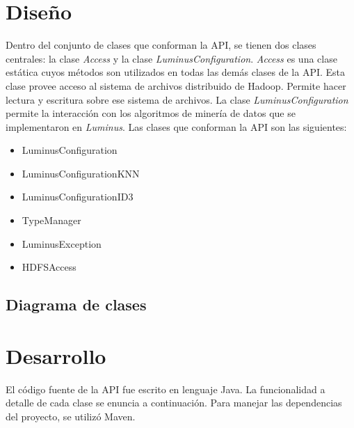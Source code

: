 \section{Diseño}
Dentro del conjunto de clases que conforman la API, se tienen dos clases centrales: la clase \emph{Access} y la clase \emph{LuminusConfiguration}. \emph{Access} es una clase estática cuyos métodos son utilizados en todas las demás clases de la API. Esta clase provee acceso al sistema de archivos distribuido de Hadoop. Permite hacer lectura y escritura sobre ese sistema de archivos. La clase \emph{LuminusConfiguration} permite la interacción con los algoritmos de minería de datos que se implementaron en \emph{Luminus}. 
Las clases que conforman la API son las siguientes:
\begin{itemize}
	\item LuminusConfiguration
	\item LuminusConfigurationKNN
	\item LuminusConfigurationID3
	\item TypeManager
	\item LuminusException
	\item HDFSAccess
\end{itemize}
\subsection{Diagrama de clases}

\section{Desarrollo}
El código fuente de la API fue escrito en lenguaje Java. La funcionalidad a detalle de cada clase se enuncia a continuación. Para manejar las dependencias del proyecto, se utilizó Maven.
